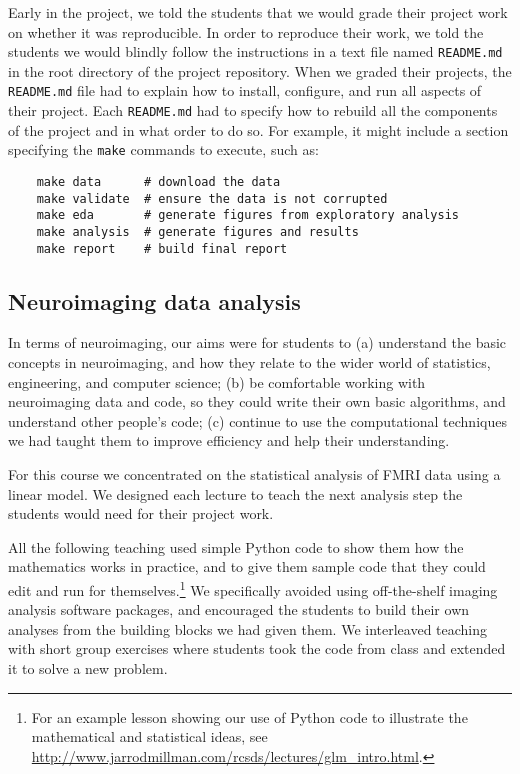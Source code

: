 Early in the project, we told the students that we would grade their project
work on whether it was reproducible.  In order to reproduce their work, we
told the students we would blindly follow the instructions in a text file
named \texttt{README.md} in the root directory of the project repository.
When we graded their projects, the \texttt{README.md} file had to explain how
to install, configure, and run all aspects of their project.
Each \texttt{README.md} had to specify how to rebuild all the components of
the project and in what order to do so.
For example, it might include a section specifying
the \texttt{make} commands to execute, such as:
\begin{verbatim}
    make data      # download the data
    make validate  # ensure the data is not corrupted
    make eda       # generate figures from exploratory analysis
    make analysis  # generate figures and results
    make report    # build final report
\end{verbatim}

\subsection{Neuroimaging data analysis}\label{analysis}

In terms of neuroimaging, our aims were for students to
(a) understand the basic concepts in neuroimaging,
and how they relate to the wider world of statistics, engineering, and computer science;
(b) be comfortable working with neuroimaging data and code, so they could write
their own basic algorithms, and understand other people's code;
(c) continue to use the computational techniques we had taught them to improve
efficiency and help their understanding.

For this course we concentrated on the statistical analysis of FMRI data using
a linear model.  We designed each lecture to teach the next analysis step the
students would need for their project work.

All the following teaching used simple Python code to show them how the
mathematics works in practice, and to give them sample code that they could
edit and run for themselves.\footnote{For an example lesson showing our use
of Python code to illustrate the mathematical and statistical ideas,
see \url{http://www.jarrodmillman.com/rcsds/lectures/glm_intro.html}.}
We specifically avoided using off-the-shelf imaging analysis software packages,
and encouraged the students to build their own analyses from the building
blocks we had given them.  We interleaved teaching with short group exercises
where students took the code from class and extended it to solve a new problem.

